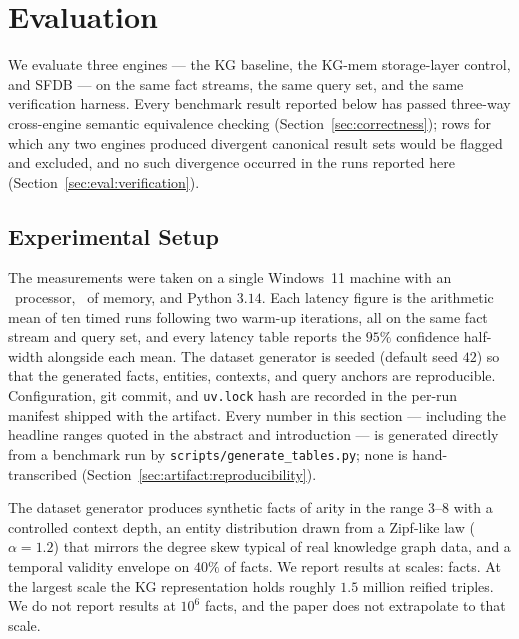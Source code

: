 \section{Evaluation}
\label{sec:evaluation}

We evaluate three engines --- the KG baseline, the KG-mem storage-layer
control, and SFDB --- on the same fact streams, the same query set, and
the same verification harness. Every benchmark result reported below has
passed three-way cross-engine semantic equivalence checking
(Section~\ref{sec:correctness}); rows for which any two engines produced
divergent canonical result sets would be flagged and excluded, and no such
divergence occurred in the runs reported here
(Section~\ref{sec:eval:verification}).

\subsection{Experimental Setup}
\label{sec:eval:setup}

The measurements were taken on a single Windows~11 machine with an
\texttt{\showcpu}\ processor, \texttt{\showmemory}\ of memory, and Python
$3.14$. Each latency figure is the arithmetic mean of ten timed runs
following two warm-up iterations, all on the same fact stream and
query set, and every latency table reports the $95\%$ confidence
half-width alongside each mean. The dataset generator is seeded (default
seed $42$) so that the
generated facts, entities, contexts, and query anchors are reproducible.
Configuration, git commit, and \texttt{uv.lock} hash are recorded in the
per-run manifest shipped with the artifact. Every number in this section
--- including the headline ranges quoted in the abstract and
introduction --- is generated directly from a benchmark run by
\texttt{scripts/generate\_tables.py}; none is hand-transcribed
(Section~\ref{sec:artifact:reproducibility}).

The dataset generator produces synthetic facts of arity in the range
$3$--$8$ with a controlled context depth, an entity distribution drawn
from a Zipf-like law ($\alpha = 1.2$) that mirrors the degree skew typical
of real knowledge graph data, and a temporal validity envelope on $40\%$ of
facts. We report results at \benchscalecount{} scales: \benchscales{}
facts. At the largest scale the KG representation holds roughly $1.5$
million reified triples. We do not report results at $10^6$ facts, and
the paper does not extrapolate to that scale.

